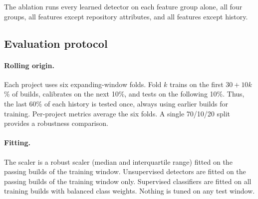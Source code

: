 \documentclass[sigconf,review,anonymous,nonacm]{acmart}
\begin{document}
The ablation runs every learned detector on each feature group alone, all four groups, all features except repository attributes, and all features except history.

\subsection{Evaluation protocol}
\label{sec:design-protocol}

\paragraph{Rolling origin.} Each project uses six expanding-window folds. Fold $k$ trains on the first $30+10k$\% of builds, calibrates on the next 10\%, and tests on the following 10\%. Thus, the last 60\% of each history is tested once, always using earlier builds for training. Per-project metrics average the six folds. A single 70/10/20 split provides a robustness comparison.

\paragraph{Fitting.} The scaler is a robust scaler (median and interquartile range) fitted on the passing builds of the training window. Unsupervised detectors are fitted on the passing builds of the training window only. Supervised classifiers are fitted on all training builds with balanced class weights. Nothing is tuned on any test window.
\end{document}
